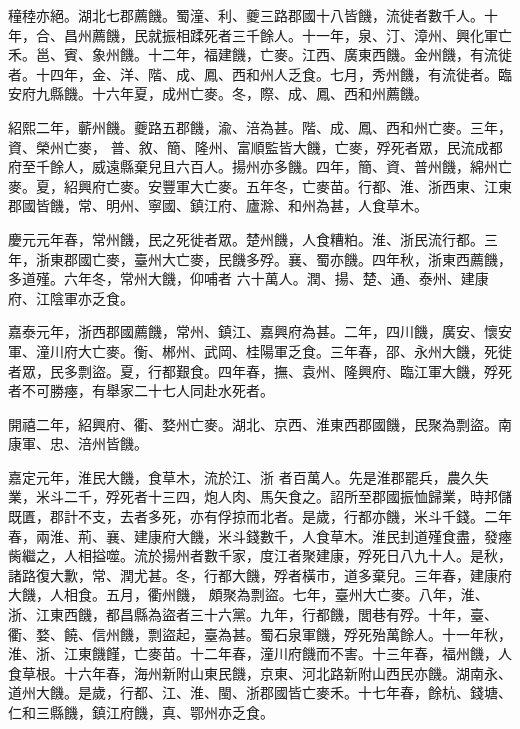 \begin{pinyinscope}
 穜稑亦絕。湖北七郡薦饑。蜀潼、利、夔三路郡國十八皆饑，流徙者數千人。十年，合、昌州薦饑，民就振相蹂死者三千餘人。十一年，泉、汀、漳州、興化軍亡禾。邕、賓、象州饑。十二年，福建饑，亡麥。江西、廣東西饑。金州饑，有流徙者。十四年，金、洋、階、成、鳳、西和州人乏食。七月，秀州饑，有流徙者。臨安府九縣饑。十六年夏，成州亡麥。冬，際、成、鳳、西和州薦饑。



 紹熙二年，蘄州饑。夔路五郡饑，渝、涪為甚。階、成、鳳、西和州亡麥。三年，資、榮州亡麥，
 普、敘、簡、隆州、富順監皆大饑，亡麥，殍死者眾，民流成都府至千餘人，威遠縣棄兒且六百人。揚州亦多饑。四年，簡、資、普州饑，綿州亡麥。夏，紹興府亡麥。安豐軍大亡麥。五年冬，亡麥苗。行都、淮、浙西東、江東郡國皆饑，常、明州、寧國、鎮江府、廬滁、和州為甚，人食草木。



 慶元元年春，常州饑，民之死徙者眾。楚州饑，人食糟粕。淮、浙民流行都。三年，浙東郡國亡麥，臺州大亡麥，民饑多殍。襄、蜀亦饑。四年秋，浙東西薦饑，多道殣。六年冬，常州大饑，仰哺者
 六十萬人。潤、揚、楚、通、泰州、建康府、江陰軍亦乏食。



 嘉泰元年，浙西郡國薦饑，常州、鎮江、嘉興府為甚。二年，四川饑，廣安、懷安軍、潼川府大亡麥。衡、郴州、武岡、桂陽軍乏食。三年春，邵、永州大饑，死徙者眾，民多剽盜。夏，行都艱食。四年春，撫、袁州、隆興府、臨江軍大饑，殍死者不可勝瘞，有舉家二十七人同赴水死者。



 開禧二年，紹興府、衢、婺州亡麥。湖北、京西、淮東西郡國饑，民聚為剽盜。南康軍、忠、涪州皆饑。



 嘉定元年，淮民大饑，食草木，流於江、浙
 者百萬人。先是淮郡罷兵，農久失業，米斗二千，殍死者十三四，炮人肉、馬矢食之。詔所至郡國振恤歸業，時邦儲既匱，郡計不支，去者多死，亦有俘掠而北者。是歲，行都亦饑，米斗千錢。二年春，兩淮、荊、襄、建康府大饑，米斗錢數千，人食草木。淮民刲道殣食盡，發瘞胔繼之，人相搤噬。流於揚州者數千家，度江者聚建康，殍死日八九十人。是秋，諸路復大歉，常、潤尤甚。冬，行都大饑，殍者橫市，道多棄兒。三年春，建康府大饑，人相食。五月，衢州饑，
 頗聚為剽盜。七年，臺州大亡麥。八年，淮、浙、江東西饑，都昌縣為盜者三十六黨。九年，行都饑，閭巷有殍。十年，臺、衢、婺、饒、信州饑，剽盜起，臺為甚。蜀石泉軍饑，殍死殆萬餘人。十一年秋，淮、浙、江東饑饉，亡麥苗。十二年春，潼川府饑而不害。十三年春，福州饑，人食草根。十六年春，海州新附山東民饑，京東、河北路新附山西民亦饑。湖南永、道州大饑。是歲，行都、江、淮、閩、浙郡國皆亡麥禾。十七年春，餘杭、錢塘、仁和三縣饑，鎮江府饑，真、鄂州亦乏食。




\end{pinyinscope}
